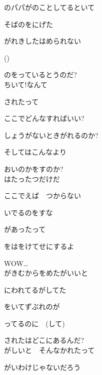 のパパがのことしてるといて

そばのをにげた

がれきしたはめられない

()

のをっているとうのだ?
\\

ちいて!なんて

されたって

ここでどんなすればいい?

しょうがないときがれるのか?

そしてはこんなより

おいのかをすのか?
\\

はたったつだけだ

ここでえば　つからない

いでるのをすな

があったって

をはをけてせにするよ

WOW…
\\

がきむからをめたがいいと

にわれてるがしてた

をいてずぶれのが

ってるのに　(して)

されたはどこにあるんだ?
\\

がしいと　そんなかれたって

がいわけじゃないだろう

